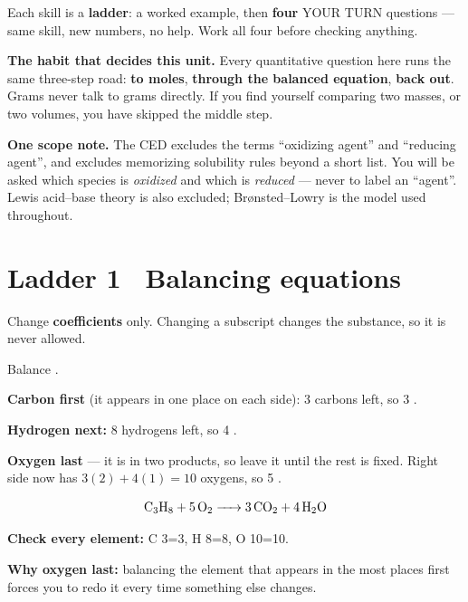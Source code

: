\documentclass{apchem-worksheet}
\begin{document}
\apctitleblock

\begin{apcnote}
Each skill is a \textbf{ladder}: a worked example, then \textbf{four}
YOUR TURN questions --- same skill, new numbers, no help. Work all four
before checking anything.

\textbf{The habit that decides this unit.} Every quantitative question
here runs the same three-step road: \textbf{to moles}, \textbf{through the
balanced equation}, \textbf{back out}. Grams never talk to grams directly.
If you find yourself comparing two masses, or two volumes, you have
skipped the middle step.

\textbf{One scope note.} The CED excludes the terms ``oxidizing agent''
and ``reducing agent'', and excludes memorizing solubility rules beyond a
short list. You will be asked which species is \emph{oxidized} and which
is \emph{reduced} --- never to label an ``agent''. Lewis acid--base theory
is also excluded; Br\o{}nsted--Lowry is the model used throughout.
\end{apcnote}

\section*{\sffamily Ladder 1 \textbullet\ Balancing equations}

Change \textbf{coefficients} only. Changing a subscript changes the
substance, so it is never allowed.

\begin{workedexample}[I do: a combustion]
Balance .

\textbf{Carbon first} (it appears in one place on each side): 3 carbons
left, so 3 .

\textbf{Hydrogen next:} 8 hydrogens left, so 4 .

\textbf{Oxygen last} --- it is in two products, so leave it until the rest
is fixed. Right side now has $3(2) + 4(1) = 10$ oxygens, so 5 .

\[ \ce{C3H8 + 5O2 -> 3CO2 + 4H2O} \]

\textbf{Check every element:} C 3=3, H 8=8, O 10=10. \checkmark

\textbf{Why oxygen last:} balancing the element that appears in the most
places first forces you to redo it every time something else changes.
\end{workedexample}
\end{document}
